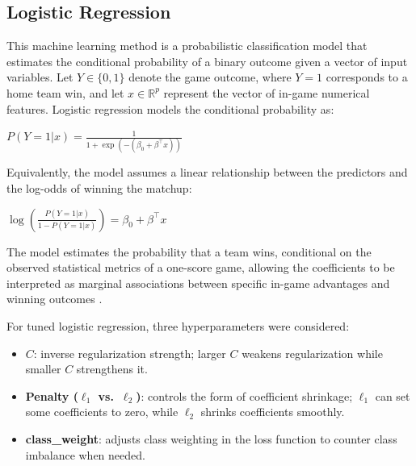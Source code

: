 \documentclass[11pt]{amsart}
\theoremstyle{definition}                  %
\theoremstyle{remark}                       %
\numberwithin{equation}{section}
\newcommand{\R}{\mathbb{R}}
\begin{document}
\subsection{Logistic Regression}
This machine learning method is a probabilistic classification model that estimates the conditional probability of a binary outcome given a vector of input variables. Let $Y \in \{0, 1\}$ denote the game outcome, where $Y = 1$ corresponds to a home team win, and let $x \in \R^p$ represent the vector of in-game numerical features. Logistic regression models the conditional probability as:
\begin{center}
    $P(Y = 1 | x) = \frac{1}{1 + \exp(-(\beta_0 + \beta^\intercal x))} $
\end{center}
Equivalently, the model assumes a linear relationship between the predictors and the log-odds of winning the matchup:
\begin{center}
    $\log (\frac{P(Y = 1 | x)}{1 - P(Y = 1 | x)}) = \beta_0 + \beta^\intercal x$
\end{center}
The model estimates the probability that a team wins, conditional on the observed statistical metrics of a one-score game, allowing the coefficients to be interpreted as marginal associations between specific in-game advantages and winning outcomes \cite{hastie2009elements, james2021introduction}.

For tuned logistic regression, three hyperparameters were considered:
\begin{itemize}
    \item \textbf{$C$}: inverse regularization strength; larger $C$ weakens regularization while smaller $C$ strengthens it.
    \item \textbf{Penalty ($\ell_1$ vs.\ $\ell_2$)}: controls the form of coefficient shrinkage; $\ell_1$ can set some coefficients to zero, while $\ell_2$ shrinks coefficients smoothly.
    \item \textbf{class\_weight}: adjusts class weighting in the loss function to counter class imbalance when needed.
\end{itemize}
\end{document}
